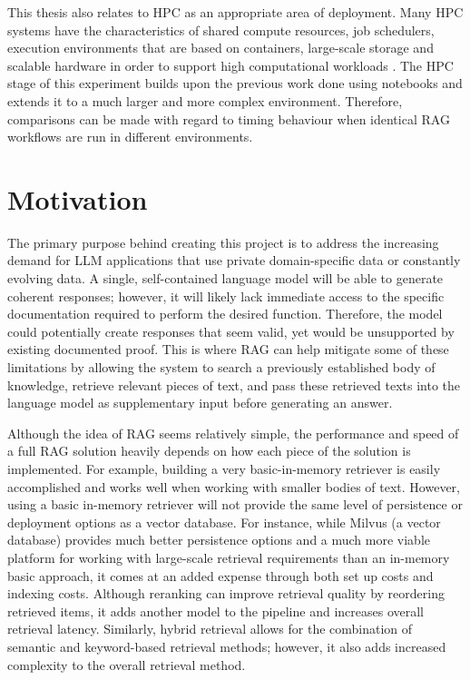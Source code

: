 This thesis also relates to \acf{HPC} as an appropriate area of deployment. Many \ac{HPC} systems have the characteristics of shared compute resources, job schedulers, execution environments that are based on containers, large-scale storage and scalable hardware in order to support high computational workloads \cite{dongarra2020hpcsurvey, kurtzer2017singularity,slurm2003}. The \ac{HPC} stage of this experiment builds upon the previous work done using notebooks and extends it to a much larger and more complex environment. Therefore, comparisons can be made with regard to timing behaviour when identical \ac{RAG} workflows are run in different environments.

\section{Motivation}

The primary purpose behind creating this project is to address the increasing demand for \acf{LLM} applications that use private domain-specific data or constantly evolving data. A single, self-contained language model will be able to generate coherent responses; however, it will likely lack immediate access to the specific documentation required to perform the desired function. Therefore, the model could potentially create responses that seem valid, yet would be unsupported by existing documented proof. This is where \ac{RAG} can help mitigate some of these limitations by allowing the system to search a previously established body of knowledge, retrieve relevant pieces of text, and pass these retrieved texts into the language model as supplementary input before generating an answer.

Although the idea of \ac{RAG} seems relatively simple, the performance and speed of a full \ac{RAG} solution heavily depends on how each piece of the solution is implemented. For example, building a very basic-in-memory retriever is easily accomplished and works well when working with smaller bodies of text. However, using a basic in-memory retriever will not provide the same level of persistence or deployment options as a vector database. For instance, while Milvus (a vector database) provides much better persistence options and a much more viable platform for working with large-scale retrieval requirements than an in-memory basic approach, it comes at an added expense through both set up costs and indexing costs. Although reranking can improve retrieval quality by reordering retrieved items, it adds another model to the pipeline and increases overall retrieval latency. Similarly, hybrid retrieval allows for the combination of semantic and keyword-based retrieval methods; however, it also adds increased complexity to the overall retrieval method.

